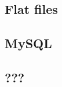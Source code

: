 \documentclass[10pt,draftclsnofoot,onecolumn]{IEEEtran}
\newcommand*{\SignatureAndDate}[1]{
	\vspace{1in}
	\par\noindent\makebox[2.5in]{\hrulefill} \hspace{.5in} \makebox[2.0in]{\hrulefill}
	\par\noindent\makebox[2.5in][l]{#1}      \hspace{.5in} \makebox[2.0in][l]{Date}
}
\begin{document}
	\subsection{Flat files}
	\subsection{MySQL}
	\subsection{???}

	\printindex






\end{document}
